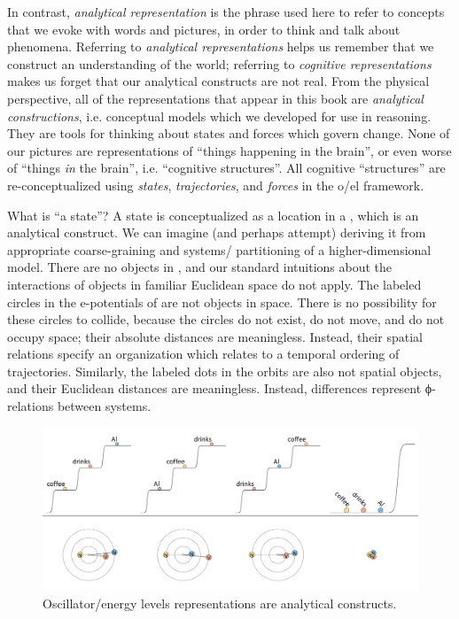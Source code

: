   In contrast, \textit{analytical representation} is the phrase used here to refer to concepts that we evoke with words and pictures, in order to think and talk about phenomena. Referring to \textit{analytical representations} helps us remember that we construct an understanding of the world; referring to \textit{cognitive representations} makes us forget that our analytical constructs are not real. From the physical perspective, all of the representations that appear in this book are \textit{analytical constructions}, i.e. conceptual models which we developed for use in reasoning. They are tools for thinking about states and forces which govern change. None of our pictures are representations of “things happening in the brain”, or even worse of “things \textit{in} the brain”, i.e. “cognitive structures”. All cognitive “structures” are re-conceptualized using \textit{states}, \textit{trajectories}, and \textit{forces} in the o/el framework. 

  What is “a state”? A state is conceptualized as a location in a , which is an analytical construct. We can imagine (and perhaps attempt) deriving it from appropriate coarse-graining and systems/ partitioning of a higher-di\-men\-sional model. There are no objects in , and our standard intuitions about the interactions of objects in familiar Euclidean space do not apply. The labeled circles in the e-potentials of {} are not objects in space. There is no possibility for these circles to collide, because the circles do not exist, do not move, and do not occupy space; their absolute distances are meaningless. Instead, their spatial relations specify an organization which relates to a temporal ordering of  trajectories. Similarly, the labeled dots in the orbits are also not spatial objects, and their Euclidean distances are meaningless. Instead,  differences represent ϕ-relations between systems.

  
\begin{figure}
\includegraphics[width=\textwidth]{figures/Tilsen-img168.png}
\caption{Oscillator/energy levels representations are analytical constructs.}
\label{fig:8:2}
\end{figure}
 

